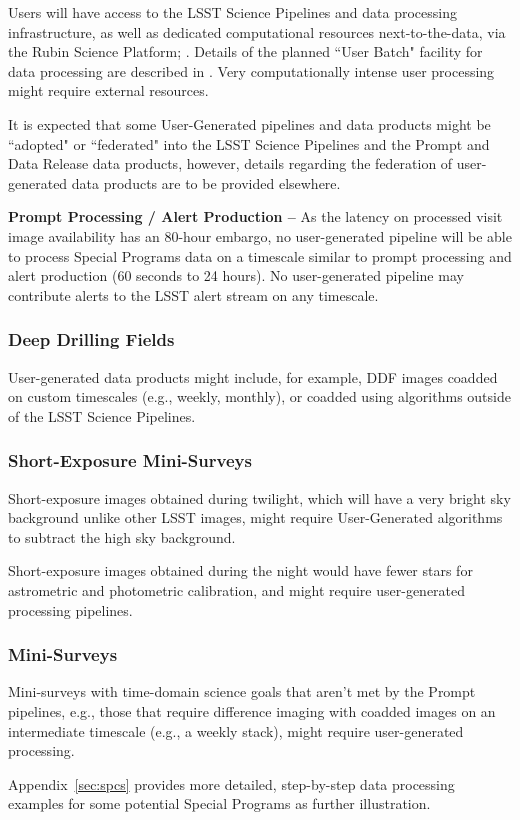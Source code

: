 Users will have access to the LSST Science Pipelines and data processing 
infrastructure, as well as dedicated computational resources next-to-the-data, 
via the Rubin Science Platform; .
Details of the planned ``User Batch" facility for data processing are described in 
.
Very computationally intense user processing might require external resources. 

It is expected that some User-Generated pipelines and data products 
might be ``adopted" or ``federated" into the LSST Science Pipelines and the Prompt 
and Data Release data products, however, details regarding the federation of 
user-generated data products are to be provided elsewhere.

\textbf{Prompt Processing / Alert Production -- }
As the latency on processed visit image availability has an 80-hour
embargo, no user-generated pipeline will be able to process Special Programs 
data on a timescale similar to prompt processing and alert production 
(60 seconds to 24 hours).
No user-generated pipeline may contribute alerts to the LSST alert stream on 
any timescale.


\subsubsection{Deep Drilling Fields}

User-generated data products might include, for example, DDF images coadded on custom 
timescales (e.g., weekly, monthly), or coadded using algorithms outside of the LSST 
Science Pipelines.


\subsubsection{Short-Exposure Mini-Surveys}

Short-exposure images obtained during twilight, which will have a very bright sky 
background unlike other LSST images, might require User-Generated algorithms to 
subtract the high sky background. 

Short-exposure images obtained during the night would have fewer stars for 
astrometric and photometric calibration, and might require user-generated 
processing pipelines.


\subsubsection{Mini-Surveys}

Mini-surveys with time-domain science goals that aren't met by the Prompt pipelines, 
e.g., those that require difference imaging with coadded images on an intermediate 
timescale (e.g., a weekly stack), might require user-generated processing.

Appendix~\ref{sec:spcs} provides more detailed, step-by-step data processing examples for some potential Special Programs as further illustration. 


